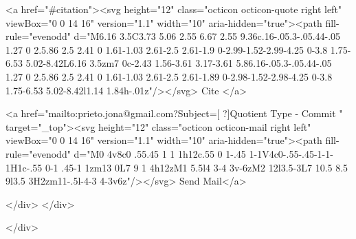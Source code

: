       <a  href="#citation"><svg height="12" class="octicon octicon-quote right left" viewBox="0 0 14 16" version="1.1" width="10" aria-hidden="true"><path fill-rule="evenodd" d="M6.16 3.5C3.73 5.06 2.55 6.67 2.55 9.36c.16-.05.3-.05.44-.05 1.27 0 2.5.86 2.5 2.41 0 1.61-1.03 2.61-2.5 2.61-1.9 0-2.99-1.52-2.99-4.25 0-3.8 1.75-6.53 5.02-8.42L6.16 3.5zm7 0c-2.43 1.56-3.61 3.17-3.61 5.86.16-.05.3-.05.44-.05 1.27 0 2.5.86 2.5 2.41 0 1.61-1.03 2.61-2.5 2.61-1.89 0-2.98-1.52-2.98-4.25 0-3.8 1.75-6.53 5.02-8.42l1.14 1.84h-.01z"/></svg> Cite
      </a>

      <a href="mailto:prieto.jona@gmail.com?Subject=[ ?]Quotient Type - Commit " target="_top"><svg height="12" class="octicon octicon-mail right left" viewBox="0 0 14 16" version="1.1" width="10" aria-hidden="true"><path fill-rule="evenodd" d="M0 4v8c0 .55.45 1 1 1h12c.55 0 1-.45 1-1V4c0-.55-.45-1-1-1H1c-.55 0-1 .45-1 1zm13 0L7 9 1 4h12zM1 5.5l4 3-4 3v-6zM2 12l3.5-3L7 10.5 8.5 9l3.5 3H2zm11-.5l-4-3 4-3v6z"/></svg> Send Mail</a>

    </div>
  </div>

</div>





